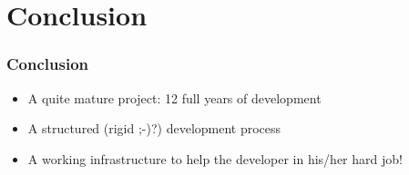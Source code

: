 \documentclass[8pt]{beamer}
\begin{document}
\section[Conclusion]{Conclusion}
\begin{frame}
  \Large
  \frametitle{Conclusion}
  \begin{itemize}
  \item A quite mature project: 12 full years of development
  \item A structured (rigid ;-)?) development process
  \item A working infrastructure to help the developer in his/her hard job!
  \end{itemize}
\end{frame}
\end{document}
